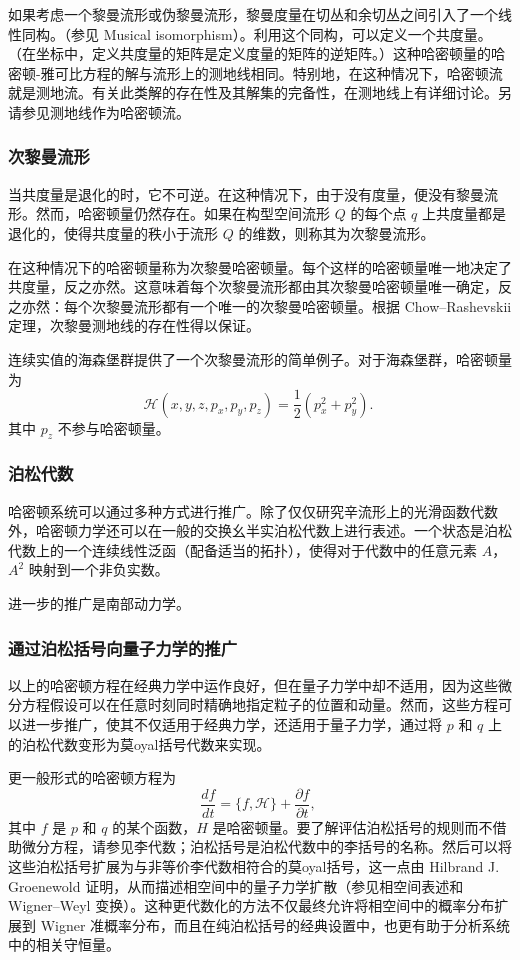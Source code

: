 如果考虑一个黎曼流形或伪黎曼流形，黎曼度量在切丛和余切丛之间引入了一个线性同构。（参见 Musical isomorphism）。利用这个同构，可以定义一个共度量。（在坐标中，定义共度量的矩阵是定义度量的矩阵的逆矩阵。）这种哈密顿量的哈密顿-雅可比方程的解与流形上的测地线相同。特别地，在这种情况下，哈密顿流就是测地流。有关此类解的存在性及其解集的完备性，在测地线上有详细讨论。另请参见测地线作为哈密顿流。 
\subsubsection{次黎曼流形}
当共度量是退化的时，它不可逆。在这种情况下，由于没有度量，便没有黎曼流形。然而，哈密顿量仍然存在。如果在构型空间流形 \( Q \) 的每个点 \( q \) 上共度量都是退化的，使得共度量的秩小于流形 \( Q \) 的维数，则称其为次黎曼流形。

在这种情况下的哈密顿量称为次黎曼哈密顿量。每个这样的哈密顿量唯一地决定了共度量，反之亦然。这意味着每个次黎曼流形都由其次黎曼哈密顿量唯一确定，反之亦然：每个次黎曼流形都有一个唯一的次黎曼哈密顿量。根据 Chow–Rashevskii 定理，次黎曼测地线的存在性得以保证。

连续实值的海森堡群提供了一个次黎曼流形的简单例子。对于海森堡群，哈密顿量为
\[
\mathcal{H}(x, y, z, p_x, p_y, p_z) = \frac{1}{2} (p_x^2 + p_y^2).~
\]
其中 \( p_z \) 不参与哈密顿量。
\subsubsection{泊松代数}
哈密顿系统可以通过多种方式进行推广。除了仅仅研究辛流形上的光滑函数代数外，哈密顿力学还可以在一般的交换幺半实泊松代数上进行表述。一个状态是泊松代数上的一个连续线性泛函（配备适当的拓扑），使得对于代数中的任意元素 \( A \)，\( A^2 \) 映射到一个非负实数。

进一步的推广是南部动力学。
\subsubsection{通过泊松括号向量子力学的推广}
以上的哈密顿方程在经典力学中运作良好，但在量子力学中却不适用，因为这些微分方程假设可以在任意时刻同时精确地指定粒子的位置和动量。然而，这些方程可以进一步推广，使其不仅适用于经典力学，还适用于量子力学，通过将 \( p \) 和 \( q \) 上的泊松代数变形为莫oyal括号代数来实现。

更一般形式的哈密顿方程为
\[
\frac{d f}{d t} = \{f, \mathcal{H}\} + \frac{\partial f}{\partial t},~
\]
其中 \( f \) 是 \( p \) 和 \( q \) 的某个函数，\( H \) 是哈密顿量。要了解评估泊松括号的规则而不借助微分方程，请参见李代数；泊松括号是泊松代数中的李括号的名称。然后可以将这些泊松括号扩展为与非等价李代数相符合的莫oyal括号，这一点由 Hilbrand J. Groenewold 证明，从而描述相空间中的量子力学扩散（参见相空间表述和 Wigner–Weyl 变换）。这种更代数化的方法不仅最终允许将相空间中的概率分布扩展到 Wigner 准概率分布，而且在纯泊松括号的经典设置中，也更有助于分析系统中的相关守恒量。